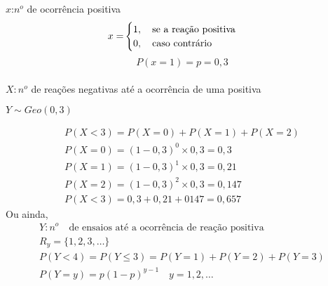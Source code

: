 \documentclass[11pt,a4paper]{book}
\begin{document}
\begin{description}
      $x$:$n^o$ de ocorrência positiva 
      \begin{align*}
        x=&\begin{cases}
          1, \text{\quad se a reação positiva}\\
          0, \text{\quad caso contrário}
        \end{cases}
      \end{align*}
      $$P(x=1)=p=0,3$$\\
      $X: n^o$ de reações negativas até a ocorrência de uma positiva\\
      \begin{center}$Y \sim Geo(0,3)$\end{center}
      \begin{align*}
        P(X<3)=P(X=0)+P(X=1)+P(X=2)\\
        P(X=0)=(1-0,3)^0 \times 0,3 = 0,3\\
        P(X=1)=(1-0,3)^1 \times 0,3 = 0,21\\
        P(X=2)=(1-0,3)^2 \times 0,3 = 0,147\\
        P(X<3)=0,3+0,21+0147=0,657
      \end{align*}
      Ou ainda,
      \begin{align*}
        Y: n^o \quad \text{de ensaios até a ocorrência de reação positiva}\\
        R_y = \{ 1,2,3,\ldots \}\\
        P( Y<4 ) = P (Y \leq 3) = P(Y=1)+ P(Y=2)+P(Y=3)\\
        P(Y=y)= p(1-p)^{y-1} \quad y=1,2,\dots
      \end{align*}
    \end{description}
\end{document}
